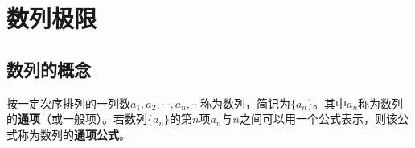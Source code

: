 \documentclass[a4paper,12pt]{article}
\begin{document}



    \section{数列极限}

    \subsection{数列的概念}

    按一定次序排列的一列数$a_1, a_2, \cdots, a_n, \cdots$称为数列，简记为$\{a_n\}$。其中$a_n$称为数列的\textbf{通项}（或一般项）。若数列$\{a_n\}$的第$n$项$a_n$与$n$之间可以用一个公式表示，则该公式称为数列的\textbf{通项公式}。
\end{document}
